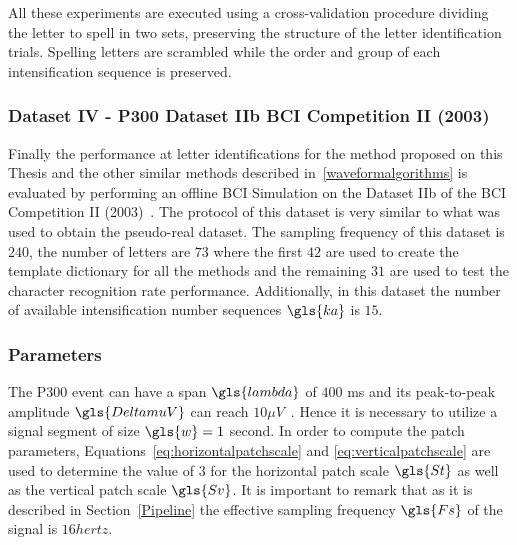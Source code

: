 All these experiments are executed using a cross-validation procedure dividing the letter to spell in two sets, preserving the structure of the letter identification trials. Spelling letters are scrambled while the order and group of each intensification sequence is preserved.

\subsubsection{Dataset IV - P300 Dataset IIb BCI Competition II (2003)}

Finally the performance at letter identifications for the method proposed on this Thesis and the other similar methods described in~\ref{waveformalgorithms} is evaluated by performing an offline BCI Simulation on the Dataset IIb of the BCI Competition II (2003)~\cite{Blankertz2002}.  The protocol of this dataset is very similar to what was used to obtain the pseudo-real dataset.  The sampling frequency of this dataset is $240$, the number of letters are $73$ where the first $42$ are used to create the template dictionary for all the methods and the remaining $31$ are used to test the character recognition rate performance.  Additionally, in this dataset the number of available intensification number sequences $\gls{ka}$ is $15$.  


\subsubsection{Parameters}

The P300 event can have a span $\gls{lambda}$ of $400$ ms and its peak-to-peak amplitude $\gls{DeltamuV}$ can reach $ 10 \mu V $~\cite{Rao2013}.  Hence it is necessary to utilize a signal segment of size $\gls{w} = 1$ second.  In order to compute the patch parameters, Equations~\ref{eq:horizontalpatchscale} and \ref{eq:verticalpatchscale} are used to determine the value of $3$ for the horizontal patch scale $\gls{St}$ as well as the vertical patch scale $\gls{Sv}$.  It is important to remark that as it is described in Section~\ref{Pipeline} the effective sampling frequency $\gls{Fs}$ of the signal is $16\si{hertz}$.


%

